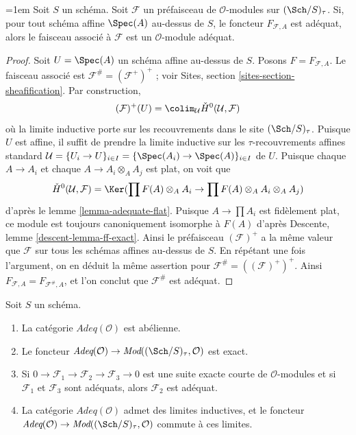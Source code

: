 \begin{lemma}
\label{lemma-sheafification-adequate}
{\emergencystretch=1em
Soit $S$ un schéma. Soit $\mathcal{F}$ un préfaisceau de $\mathcal{O}$-modules
sur $(\Sch/S)_\tau$. Si, pour tout schéma affine
$\Spec(A)$ au-dessus de $S$, le foncteur $F_{\mathcal{F}, A}$ est
adéquat, alors le faisceau associé à $\mathcal{F}$ est un
$\mathcal{O}$-module adéquat.\par}
\end{lemma}

\begin{proof}
Soit $U = \Spec(A)$ un schéma affine au-dessus de $S$.
Posons $F = F_{\mathcal{F}, A}$.
Le faisceau associé est $\mathcal{F}^\# = (\mathcal{F}^+)^+$ ; voir
Sites, section \ref{sites-section-sheafification}.
Par construction,
$$
(\mathcal{F})^+(U) =
\colim_\mathcal{U} \check{H}^0(\mathcal{U}, \mathcal{F})
$$
où la limite inductive porte sur les recouvrements dans le site $(\Sch/S)_\tau$.
Puisque $U$ est affine, il suffit de prendre la limite inductive sur les
$\tau$-recouvrements affines standard
$\mathcal{U} = \{U_i \to U\}_{i \in I} =
\{\Spec(A_i) \to \Spec(A)\}_{i \in I}$ de $U$.
Puisque chaque $A \to A_i$ et chaque $A \to A_i \otimes_A A_j$ est plat, on voit que
$$
\check{H}^0(\mathcal{U}, \mathcal{F}) =
\Ker(\prod F(A) \otimes_A A_i \to \prod F(A) \otimes_A A_i \otimes_A A_j)
$$
d'après le
lemme \ref{lemma-adequate-flat}.
Puisque $A \to \prod A_i$ est fidèlement plat, ce module
est toujours canoniquement isomorphe à $F(A)$ d'après
Descente, lemme \ref{descent-lemma-ff-exact}.
Ainsi le préfaisceau $(\mathcal{F})^+$ a la même valeur que
$\mathcal{F}$ sur tous les schémas affines au-dessus de $S$. En répétant une fois
l'argument, on en déduit la même assertion pour $\mathcal{F}^\# = ((\mathcal{F})^+)^+$.
Ainsi $F_{\mathcal{F}, A} = F_{\mathcal{F}^\#, A}$, et l'on conclut
que $\mathcal{F}^\#$ est adéquat.
\end{proof}

\begin{lemma}
\label{lemma-abelian-adequate}
Soit $S$ un schéma.
\begin{enumerate}
\item La catégorie $\textit{Adeq}(\mathcal{O})$ est abélienne.
\item Le foncteur
$\textit{Adeq}(\mathcal{O}) \to
\textit{Mod}((\Sch/S)_\tau, \mathcal{O})$
est exact.
\item Si $0 \to \mathcal{F}_1 \to \mathcal{F}_2 \to \mathcal{F}_3 \to 0$
est une suite exacte courte de $\mathcal{O}$-modules et si
$\mathcal{F}_1$ et $\mathcal{F}_3$ sont adéquats, alors
$\mathcal{F}_2$ est adéquat.
\item La catégorie $\textit{Adeq}(\mathcal{O})$ admet des limites inductives, et
le foncteur
$\textit{Adeq}(\mathcal{O}) \to
\textit{Mod}((\Sch/S)_\tau, \mathcal{O})$
commute à ces limites.
\end{enumerate}
\end{lemma}

